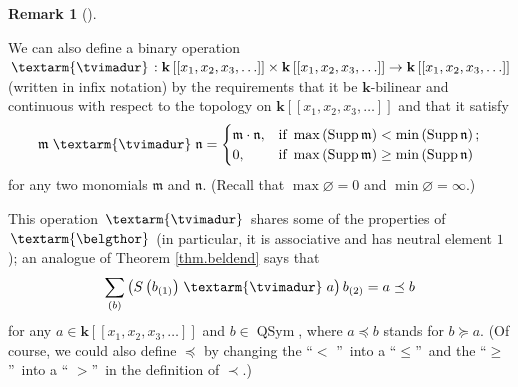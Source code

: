 \documentclass
[numbers=enddot,12pt,final,onecolumn,notitlepage,abstracton]{scrartcl}%
\theoremstyle{definition}
\newtheorem{remk}[theo]{Remark}
\newenvironment{remark}[1][]
{\begin{remk}[#1]\begin{leftbar}}
{\end{leftbar}\end{remk}}
\newenvironment{vershort}{}{}
\newcommand{\tvi}{\left. \textarm{\tvimadur} \right.}
\newcommand{\bel}{\left. \textarm{\belgthor} \right.}
\let\sumnonlimits\sum
\renewcommand{\sum}{\sumnonlimits\limits}
\begin{document}
\begin{vershort}
\begin{remark}
We can also define a binary operation $\tvi
:\mathbf{k}\left[  \left[  x_{1},x_{2},x_{3},\ldots\right]  \right]
\times\mathbf{k}\left[  \left[  x_{1},x_{2},x_{3},\ldots\right]  \right]
\rightarrow\mathbf{k}\left[  \left[  x_{1},x_{2},x_{3},\ldots\right]  \right]
$ (written in infix notation) by the requirements that it be $\mathbf{k}%
$-bilinear and continuous with respect to the topology on $\mathbf{k}\left[
\left[  x_{1},x_{2},x_{3},\ldots\right]  \right]  $ and that it satisfy%
\[
\mathfrak{m}\tvi \mathfrak{n}=
\begin{cases}
\mathfrak{m}\cdot\mathfrak{n}, & \text{if }\max\left(  \operatorname*{Supp}%
\mathfrak{m}\right)  <\min\left(  \operatorname*{Supp}\mathfrak{n}\right)  ;\\
0, & \text{if }\max\left(  \operatorname*{Supp}\mathfrak{m}\right)  \geq
\min\left(  \operatorname*{Supp}\mathfrak{n}\right)
\end{cases}
\]
for any two monomials $\mathfrak{m}$ and $\mathfrak{n}$. (Recall that
$\max\varnothing=0$ and $\min\varnothing=\infty$.)

This operation $\tvi $ shares some of the properties of $\bel $ (in
particular, it is associative and has neutral element $1$); an analogue of
Theorem \ref{thm.beldend} says that
\[
\sum_{\left(  b\right)  }\left(  S\left(  b_{\left(  1\right)  }\right)
\tvi a\right)  b_{\left(  2\right)  }=a\left.  \preceq\right.  b
\]
for any $a\in\mathbf{k}\left[  \left[  x_{1},x_{2},x_{3},\ldots\right]
\right]  $ and $b\in\operatorname*{QSym}$, where $a\left.  \preceq\right.  b$
stands for $b\left.  \succeq\right.  a$. (Of course, we could also define
$\left.  \preceq\right.  $ by changing the \textquotedblleft$<$%
\textquotedblright\ into a \textquotedblleft$\leq$\textquotedblright\ and the
\textquotedblleft$\geq$\textquotedblright\ into a \textquotedblleft%
$>$\textquotedblright\ in the definition of $\left.  \prec\right.  $.)
\end{remark}
\end{vershort}
\end{document}
